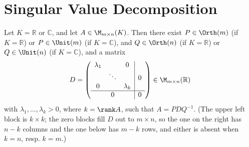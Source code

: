\renewcommand{\thetheorem}{26.a.\arabic{theorem}}
\setcounter{theorem}{0}
\setcounter{chapter}{25}

\chapter{Singular Value Decomposition}

\begin{theorem}
\label{thm:singular_value_decomposition}
Let $K = \mathbb{R}$ or $\mathbb{C}$, and let $A \in \M_{m \times n}(K)$. Then there exist $P \in \Orth(m)$ (if $K = \mathbb{R}$) or $P \in \Unit(m)$ (if $K = \mathbb{C}$), and $Q \in \Orth(n)$ (if $K = \mathbb{R}$) or $Q \in \Unit(n)$ (if $K = \mathbb{C}$), and a  matrix
\[
D = \left(
\begin{array}{ccc|c}
\lambda_1 & & 0 & \\
& \ddots & & 0 \\
0 & & \lambda_k & \\
\hline
\multicolumn{3}{c|}{0} & 0
\end{array}
\right) \in \M_{m \times n}(\mathbb{R})
\]
with $\lambda_1, \dots, \lambda_k > 0$, where $k = \rank A$, such that $A = P D Q^{-1}$.
(The upper left block is $k \times k$; the zero blocks fill $D$ out to $m \times n$, so the one on the right has $n - k$ columns and the one below has $m - k$ rows, and either is absent when $k = n$, resp. $k = m$.)
\end{theorem}

